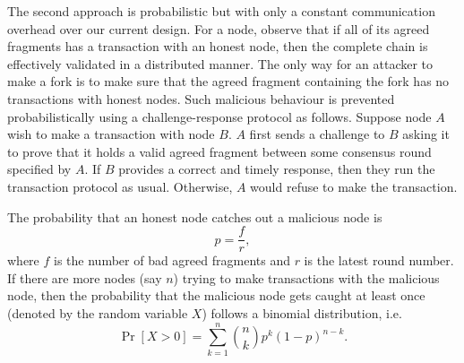 The second approach is probabilistic but with only a constant communication overhead over our current design.
For a node, observe that if all of its agreed fragments has a transaction with an honest node,
then the complete chain is effectively validated in a distributed manner.
The only way for an attacker to make a fork is to make sure that the agreed fragment containing the fork has no transactions with honest nodes.
Such malicious behaviour is prevented probabilistically using a challenge-response protocol as follows.
Suppose node $A$ wish to make a transaction with node $B$.
$A$ first sends a challenge to $B$ asking it to prove that it holds a valid agreed fragment between some consensus round specified by $A$.
If $B$ provides a correct and timely response, then they run the transaction protocol as usual.
Otherwise, $A$ would refuse to make the transaction.

The probability that an honest node catches out a malicious node is 
$$p = \frac{f}{r},$$
where $f$ is the number of bad agreed fragments and $r$ is the latest round number.
If there are more nodes (say $n$) trying to make transactions with the malicious node,
then the probability that the malicious node gets caught at least once (denoted by the random variable $X$) follows a binomial distribution, i.e.
$$\Pr[X > 0] = \sum_{k = 1}^{n}\binom{n}{k}p^k (1 - p)^{n - k}.$$









